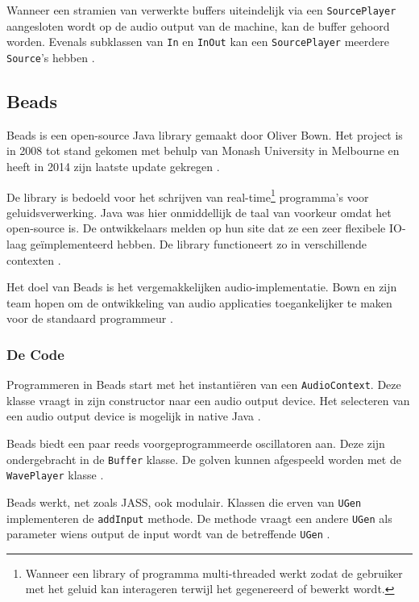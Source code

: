 Wanneer een stramien van verwerkte buffers uiteindelijk via een \verb+SourcePlayer+ aangesloten wordt op de audio output van de machine, kan de buffer gehoord worden. Evenals subklassen van \verb+In+ en \verb+InOut+ kan een \verb+SourcePlayer+ meerdere \verb+Source+'s hebben \autocite{jass}.

\subsection{Beads}

Beads is een open-source Java library gemaakt door Oliver Bown. Het project is in 2008 tot stand gekomen met behulp van Monash University in Melbourne en heeft in 2014 zijn laatste update gekregen \autocite{beads}.

De library is bedoeld voor het schrijven van real-time\footnote{Wanneer een library of programma multi-threaded werkt zodat de gebruiker met het geluid kan interageren terwijl het gegenereerd of bewerkt wordt.} programma's voor geluidsverwerking. Java was hier onmiddellijk de taal van voorkeur omdat het open-source is. De ontwikkelaars melden op hun site dat ze een zeer flexibele IO-laag geïmplementeerd hebben. De library functioneert zo in verschillende contexten \autocite{beads}. 

Het doel van Beads is het vergemakkelijken audio-implementatie. Bown en zijn team hopen om de ontwikkeling van audio applicaties toegankelijker te maken voor de standaard programmeur \autocite{beads2}.

\subsubsection*{De Code}

Programmeren in Beads start met het instantiëren van een \verb+AudioContext+. Deze klasse vraagt in zijn constructor naar een audio output device. Het selecteren van een audio output device is mogelijk in native Java \autocite{beadsdocs}.

Beads biedt een paar reeds voorgeprogrammeerde oscillatoren aan. Deze zijn ondergebracht in de \verb+Buffer+ klasse. De golven kunnen afgespeeld worden met de \verb+WavePlayer+ klasse \autocite{beadsdocs}.

Beads werkt, net zoals JASS, ook modulair. Klassen die erven van \verb+UGen+ implementeren de \verb+addInput+ methode. De methode vraagt een andere \verb+UGen+ als parameter wiens output de input wordt van de betreffende \verb+UGen+ \autocite{beadsdocs}.

